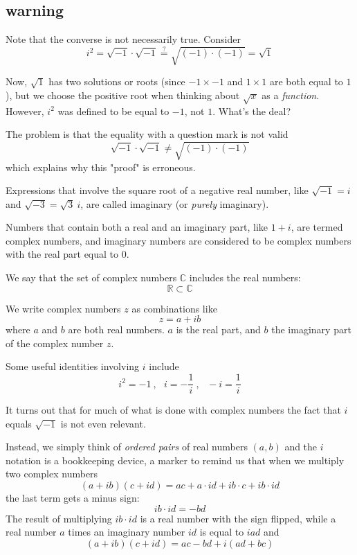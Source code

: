 \documentclass[11pt, oneside]{article}
\begin{document}
\subsection*{warning}

Note that the converse is not necessarily true.  Consider
\[ i^2 = \sqrt{-1} \cdot \sqrt{-1} \stackrel{?}{=} \sqrt{(-1)\cdot (-1)} = \sqrt{1} \]

Now, $\sqrt{1}$ has two solutions or roots (since $-1 \times -1$ and $1 \times 1$ are both equal to $1$), but we choose the positive root when thinking about $\sqrt{x}$ as a \emph{function}.  However, $i^2$ was defined to be equal to $-1$, not $1$.  What's the deal?

The problem is that the equality with a question mark is not valid
\[ \sqrt{-1} \cdot \sqrt{-1} \ne \sqrt{(-1)\cdot (-1)} \]
which explains why this "proof" is erroneous.

Expressions that involve the square root of a negative real number, like $\sqrt{-1} = i$ and $\sqrt{-3} = \sqrt{3}\ i$, are called imaginary (or \emph{purely} imaginary).  

Numbers that contain both a real and an imaginary part, like $1 + i$, are termed complex numbers, and imaginary numbers are considered to be complex numbers with the real part equal to $0$.

We say that the set of complex numbers $\mathbb{C}$ includes the real numbers:
\[ \mathbb{R} \subset \mathbb{C} \]

We write complex numbers $z$ as combinations like
\[ z = a + ib \]
 where $a$ and $b$ are both real numbers.  $a$ is the real part, and $b$ the imaginary part of the complex number $z$.

Some useful identities involving $i$ include
\[ i^2 = -1 \ , \ \ \  i = -\frac{1}{i} \ , \ \ \  -i = \frac{1}{i} \]

It turns out that for much of what is done with complex numbers the fact that $i$ equals $\sqrt{-1}$ is not even relevant.

Instead, we simply think of \emph{ordered pairs} of real numbers $(a,b)$ and the $i$ notation is a bookkeeping device, a marker to remind us that when we multiply two complex numbers
\[ (a + ib) (c + id) = ac + a \cdot id + ib \cdot c + ib \cdot id \]
the last term gets a minus sign:
\[ ib \cdot id = -bd \]
The result of multiplying $ib \cdot id$ is a real number with the sign flipped, while a real number $a$ times an imaginary number $id$ is equal to $iad$ and
\[ (a + ib) (c + id) = ac -bd + i(ad + bc) \]
\end{document}
